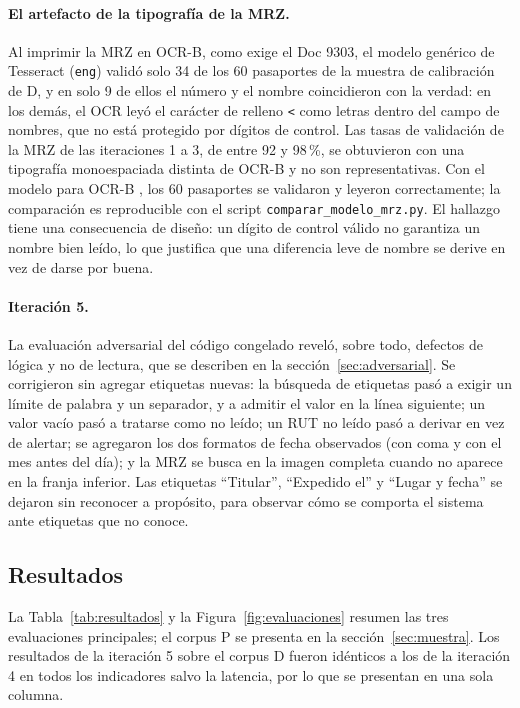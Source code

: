 \documentclass[11pt,a4paper]{article}
\begin{document}
\paragraph{El artefacto de la tipografía de la MRZ.}\label{sec:mrz} Al imprimir la MRZ en OCR-B, como exige el Doc 9303, el modelo genérico de Tesseract (\texttt{eng}) validó solo 34 de los 60 pasaportes de la muestra de calibración de D, y en solo 9 de ellos el número y el nombre coincidieron con la verdad: en los demás, el OCR leyó el carácter de relleno \texttt{<} como letras dentro del campo de nombres, que no está protegido por dígitos de control. Las tasas de validación de la MRZ de las iteraciones 1 a 3, de entre 92 y 98\,\%, se obtuvieron con una tipografía monoespaciada distinta de OCR-B y no son representativas. Con el modelo para OCR-B \cite{doubango}, los 60 pasaportes se validaron y leyeron correctamente; la comparación es reproducible con el script \texttt{comparar\_modelo\_mrz.py}. El hallazgo tiene una consecuencia de diseño: un dígito de control válido no garantiza un nombre bien leído, lo que justifica que una diferencia leve de nombre se derive en vez de darse por buena.

\paragraph{Iteración 5.} La evaluación adversarial del código congelado reveló, sobre todo, defectos de lógica y no de lectura, que se describen en la sección~\ref{sec:adversarial}. Se corrigieron sin agregar etiquetas nuevas: la búsqueda de etiquetas pasó a exigir un límite de palabra y un separador, y a admitir el valor en la línea siguiente; un valor vacío pasó a tratarse como no leído; un RUT no leído pasó a derivar en vez de alertar; se agregaron los dos formatos de fecha observados (con coma y con el mes antes del día); y la MRZ se busca en la imagen completa cuando no aparece en la franja inferior. Las etiquetas ``Titular'', ``Expedido el'' y ``Lugar y fecha'' se dejaron sin reconocer a propósito, para observar cómo se comporta el sistema ante etiquetas que no conoce.

\subsection{Resultados}
\label{sec:resultados}
La Tabla~\ref{tab:resultados} y la Figura~\ref{fig:evaluaciones} resumen las tres evaluaciones principales; el corpus P se presenta en la sección~\ref{sec:muestra}. Los resultados de la iteración 5 sobre el corpus D fueron idénticos a los de la iteración 4 en todos los indicadores salvo la latencia, por lo que se presentan en una sola columna.
\end{document}
